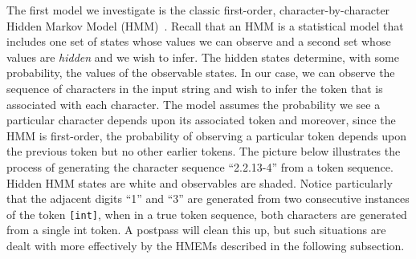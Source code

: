 The first model we investigate is the classic first-order,
character-by-character Hidden Markov Model (HMM)~\cite{rabiner89:hmm}.
Recall that an HMM is a statistical model that includes one set of
states whose values we can observe and a second set whose values are
{\em hidden} and we wish to infer.  The hidden states determine, with
some probability, the values of the observable states.  In our case,
we can observe the sequence of characters in the input string and wish
to infer the token that is associated with each character.  
The model assumes the probability we see a particular character 
depends upon its associated token and moreover, since the
HMM is first-order, the probability of observing a
particular token depends upon the previous token but no other
earlier tokens.  The picture below illustrates the process of
generating the character sequence ``2.2.13-4'' from a token
sequence.  Hidden HMM states are white and observables are shaded.  
Notice particularly that the adjacent digits ``1'' and ``3'' are 
generated from two consecutive instances of the token {\tt [int]},
when in a true token sequence, both characters are generated from 
a single int token.  A postpass will clean this up, but such 
situations are dealt with more effectively by the HMEMs described in
the following subsection.



\begin{center}
\end{center}

